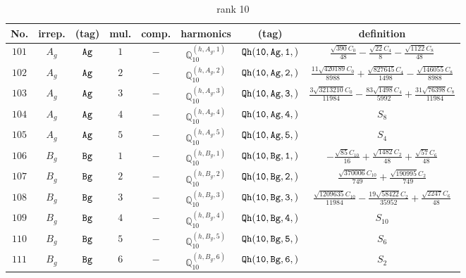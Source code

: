 \documentclass[fleqn,8pt]{jsarticle}
\begin{document}
\begin{table}[ht!]
\begin{center}
\caption{rank 10}
\renewcommand{\arraystretch}{1.3}
\begin{tabular}{cccccccc} \hline \hline
No. & irrep. & (tag) & mul. & comp. & harmonics & (tag) & definition \\ \hline
$ 101 $ & $ A_{g} $ & $ {\tt Ag} $ & $ 1 $ & $ - $ & $ \mathbb{Q}_{10}^{(h,A_{g},1)} $ & $ {\tt Qh(10,Ag,1,)} $ & $ \frac{\sqrt{390} C_{0}}{48} - \frac{\sqrt{22} C_{4}}{8} - \frac{\sqrt{1122} C_{8}}{48} $ \\
$ 102 $ & $ A_{g} $ & $ {\tt Ag} $ & $ 2 $ & $ - $ & $ \mathbb{Q}_{10}^{(h,A_{g},2)} $ & $ {\tt Qh(10,Ag,2,)} $ & $ \frac{11 \sqrt{420189} C_{0}}{8988} + \frac{\sqrt{827645} C_{4}}{1498} - \frac{\sqrt{146055} C_{8}}{8988} $ \\
$ 103 $ & $ A_{g} $ & $ {\tt Ag} $ & $ 3 $ & $ - $ & $ \mathbb{Q}_{10}^{(h,A_{g},3)} $ & $ {\tt Qh(10,Ag,3,)} $ & $ \frac{3 \sqrt{3213210} C_{0}}{11984} - \frac{83 \sqrt{1498} C_{4}}{5992} + \frac{31 \sqrt{76398} C_{8}}{11984} $ \\
$ 104 $ & $ A_{g} $ & $ {\tt Ag} $ & $ 4 $ & $ - $ & $ \mathbb{Q}_{10}^{(h,A_{g},4)} $ & $ {\tt Qh(10,Ag,4,)} $ & $ S_{8} $ \\
$ 105 $ & $ A_{g} $ & $ {\tt Ag} $ & $ 5 $ & $ - $ & $ \mathbb{Q}_{10}^{(h,A_{g},5)} $ & $ {\tt Qh(10,Ag,5,)} $ & $ S_{4} $ \\
$ 106 $ & $ B_{g} $ & $ {\tt Bg} $ & $ 1 $ & $ - $ & $ \mathbb{Q}_{10}^{(h,B_{g},1)} $ & $ {\tt Qh(10,Bg,1,)} $ & $ - \frac{\sqrt{85} C_{10}}{16} + \frac{\sqrt{1482} C_{2}}{48} + \frac{\sqrt{57} C_{6}}{48} $ \\
$ 107 $ & $ B_{g} $ & $ {\tt Bg} $ & $ 2 $ & $ - $ & $ \mathbb{Q}_{10}^{(h,B_{g},2)} $ & $ {\tt Qh(10,Bg,2,)} $ & $ \frac{\sqrt{370006} C_{10}}{749} + \frac{\sqrt{190995} C_{2}}{749} $ \\
$ 108 $ & $ B_{g} $ & $ {\tt Bg} $ & $ 3 $ & $ - $ & $ \mathbb{Q}_{10}^{(h,B_{g},3)} $ & $ {\tt Qh(10,Bg,3,)} $ & $ \frac{\sqrt{1209635} C_{10}}{11984} - \frac{19 \sqrt{58422} C_{2}}{35952} + \frac{\sqrt{2247} C_{6}}{48} $ \\
$ 109 $ & $ B_{g} $ & $ {\tt Bg} $ & $ 4 $ & $ - $ & $ \mathbb{Q}_{10}^{(h,B_{g},4)} $ & $ {\tt Qh(10,Bg,4,)} $ & $ S_{10} $ \\
$ 110 $ & $ B_{g} $ & $ {\tt Bg} $ & $ 5 $ & $ - $ & $ \mathbb{Q}_{10}^{(h,B_{g},5)} $ & $ {\tt Qh(10,Bg,5,)} $ & $ S_{6} $ \\
$ 111 $ & $ B_{g} $ & $ {\tt Bg} $ & $ 6 $ & $ - $ & $ \mathbb{Q}_{10}^{(h,B_{g},6)} $ & $ {\tt Qh(10,Bg,6,)} $ & $ S_{2} $ \\

\end{tabular}
\end{center}
\end{table}
\end{document}
